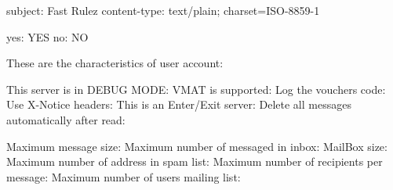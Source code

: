 subject: Fast Rulez
content-type: text/plain; charset=ISO-8859-1 

yes: YES
no: NO

These are the characteristics of user account:

This server is in DEBUG MODE: 			%
VMAT is supported: 				%
Log the vouchers code: 				%
Use X-Notice headers: 				%
This is an Enter/Exit server: 			%
Delete all messages automatically after read: 	%

Maximum message size: 				%
Maximum number of messaged in inbox: 		%
MailBox size:					%
Maximum number of address in spam list: 	%
Maximum number of recipients per message: 	%
Maximum number of users mailing list: 		%


